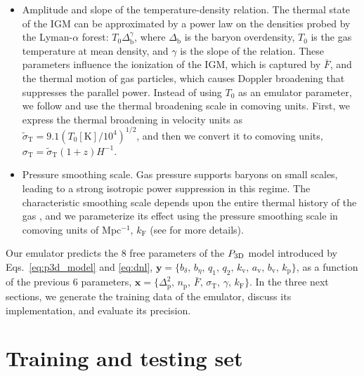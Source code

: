 \documentclass{aa}
\newcommand{\lyaf}{Lyman-$\alpha$ forest\xspace}
\newcommand{\pthreed}{\ensuremath{P_{\rm 3D}}\xspace}
\newcommand{\mflux}{\ensuremath{\bar{F}}\xspace}
\providecommand{\DIFaddtex}[1]{{\protect\color{blue}\uwave{#1}}} %
\providecommand{\DIFdeltex}[1]{{\protect\color{red}\sout{#1}}}                      %
\providecommand{\DIFaddbegin}{} %
\providecommand{\DIFaddend}{} %
\providecommand{\DIFdelbegin}{} %
\providecommand{\DIFdelend}{} %
\providecommand{\DIFadd}[1]{\texorpdfstring{\DIFaddtex{#1}}{#1}} %
\providecommand{\DIFdel}[1]{\texorpdfstring{\DIFdeltex{#1}}{}} %
\newcommand{\DIFscaledelfig}{0.5}
\newlength{\DIFdelgraphicswidth} %
\newlength{\DIFdelgraphicsheight} %
\newcommand{\DIFaddincludegraphics}[2][]{{\color{blue}\fbox{\DIFOincludegraphics[#1]{#2}}}} %
\newcommand{\DIFdelincludegraphics}[2][]{%
\sbox{\DIFdelgraphicsbox}{\DIFOincludegraphics[#1]{#2}}%
\settoboxwidth{\DIFdelgraphicswidth}{\DIFdelgraphicsbox} %
\settoboxtotalheight{\DIFdelgraphicsheight}{\DIFdelgraphicsbox} %
\scalebox{\DIFscaledelfig}{%
\parbox[b]{\DIFdelgraphicswidth}{\usebox{\DIFdelgraphicsbox}\\[-\baselineskip] \rule{\DIFdelgraphicswidth}{0em}}\llap{\resizebox{\DIFdelgraphicswidth}{\DIFdelgraphicsheight}{%
\setlength{\unitlength}{\DIFdelgraphicswidth}%
\begin{picture}(1,1)%
\thicklines\linethickness{2pt} %
{\color[rgb]{1,0,0}\put(0,0){\framebox(1,1){}}}%
{\color[rgb]{1,0,0}\put(0,0){\line( 1,1){1}}}%
{\color[rgb]{1,0,0}\put(0,1){\line(1,-1){1}}}%
\end{picture}%
}\hspace*{3pt}}} %
} %
\DeclareRobustCommand{\DIFaddbegin}{\DIFOaddbegin \let\includegraphics\DIFaddincludegraphics} %
\DeclareRobustCommand{\DIFaddend}{\DIFOaddend \let\includegraphics\DIFOincludegraphics} %
\DeclareRobustCommand{\DIFdelbegin}{\DIFOdelbegin \let\includegraphics\DIFdelincludegraphics} %
\DeclareRobustCommand{\DIFdelend}{\DIFOaddend \let\includegraphics\DIFOincludegraphics} %
\begin{document}
\begin{itemize}
    \item Amplitude and slope of the temperature-density relation. The thermal state of the IGM can be approximated by a power law on the densities probed by the \lyaf \citep{hydro_Lukic2015}: \DIFdelbegin \DIFdel{$T_0\Delta_\mathrm{b}^\gamma$}\DIFdelend \DIFaddbegin \DIFadd{$T_0\Delta_\mathrm{b}^{\gamma-1}$}\DIFaddend , where $\Delta_\mathrm{b}$ is the baryon overdensity, $T_0$ is the gas temperature at mean density, and \DIFdelbegin \DIFdel{$\gamma$ }\DIFdelend \DIFaddbegin \DIFadd{$\gamma-1$ }\DIFaddend is the slope of the relation. These parameters influence the ionization of the IGM, which is captured by \mflux, and the thermal motion of gas particles, which causes Doppler broadening that suppresses the parallel power. Instead of using $T_0$ as an emulator parameter, we follow \citet{Pedersen2021} and use the thermal broadening scale in comoving units. First, we express the thermal broadening in velocity units as $\tilde{\sigma}_\mathrm{T} = 9.1 (T_0[\mathrm{K}]/10^4)^{1/2}$, and then we convert it to comoving units, $\sigma_\mathrm{T}=\tilde{\sigma}_\mathrm{T}(1+z) H^{-1}$.

    \item Pressure smoothing scale. Gas pressure supports baryons on small scales, leading to a strong isotropic power suppression in this regime. The characteristic smoothing scale depends upon the entire thermal history of the gas \citep{gnedin1998ProbingUniverseLyalpha}, and we parameterize its effect using the pressure smoothing scale in comoving units of Mpc$^{-1}$, $k_\mathrm{F}$ (see \citet{Pedersen2021} for more details).
\end{itemize}

Our emulator predicts the 8 free parameters of the \pthreed model introduced by Eqs.~\ref{eq:p3d_model} and \ref{eq:dnl}, $\mathbf{y}=\{b_\delta,\, b_\eta,\, q_1,\, q_2,\, k_\mathrm{v},\, a_\mathrm{v},\, b_\mathrm{v}, \, k_\mathrm{p}\}$, as a function of the previous 6 parameters, $\mathbf{x}=\{\Delta_\mathrm{p}^2,\, n_\mathrm{p},\, \mflux,\, \sigma_\mathrm{T},\, \gamma,\, k_\mathrm{F}\}$. In the three next sections, we generate the training data of the emulator, discuss its implementation, and evaluate its precision.


\section{Training and testing set}
\label{sec:input}
\end{document}

